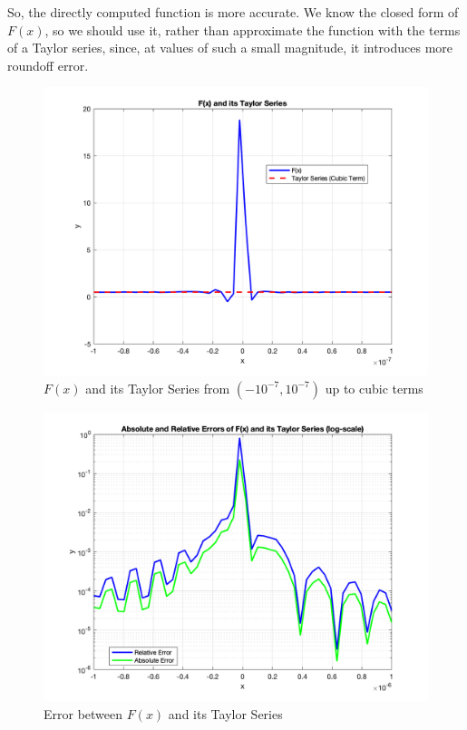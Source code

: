 \documentclass[letter,11pt]{article}
\begin{document}
So, the directly computed function is more accurate. We know the closed form of $F(x)$, so we should use it, rather than approximate the function with the terms of a Taylor series, since, at values of such a small magnitude, it introduces more roundoff error.

\begin{figure}[h]
  \centering
  \includegraphics[width=0.8\linewidth]{lab1b_3.png}
  \caption{$F(x)$ and its Taylor Series from $(-10^{-7}, 10^{-7})$ up to cubic terms}
  \label{fig:lab1b_3}
\end{figure}

\begin{figure}[h]
  \centering
  \includegraphics[width=0.8\linewidth]{lab1b_3_error.png}
  \caption{Error between $F(x)$ and its Taylor Series}
  \label{fig:lab1b_3_error}
\end{figure}
\end{document}
